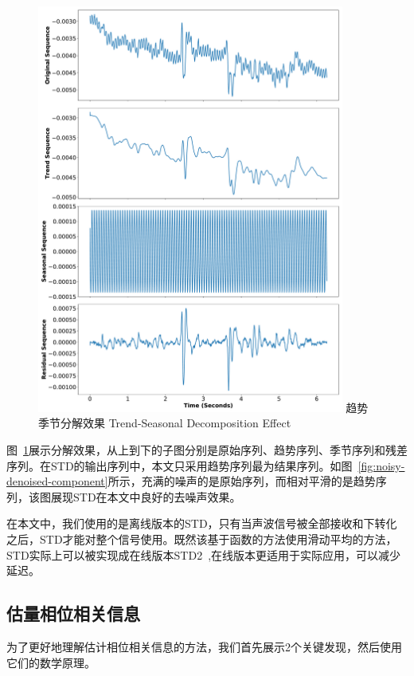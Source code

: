 \begin{figure}[!htp]
  \centering
  \includegraphics[width=0.9\textwidth]{figure/std-effect.pdf}
  \bicaption
    {趋势季节分解效果}
    {Trend-Seasonal Decomposition Effect}
  \label{fig:trend-seasonal-decomposition-effect}
\end{figure}
图~\ref{fig:trend-seasonal-decomposition-effect}展示分解效果，从上到下的子图分别是原始序列、趋势序列、季节序列和残差序列。在STD的输出序列中，本文只采用趋势序列最为结果序列。如图~\ref{fig:noisy-denoised-component}所示，充满的噪声的是原始序列，而相对平滑的是趋势序列，该图展现STD在本文中良好的去噪声效果。

在本文中，我们使用的是离线版本的STD，只有当声波信号被全部接收和下转化之后，STD才能对整个信号使用。既然该基于函数的方法使用滑动平均的方法，STD实际上可以被实现成在线版本STD2~\cite{std2},在线版本更适用于实际应用，可以减少延迟。

\subsection{估量相位相关信息}
为了更好地理解估计相位相关信息的方法，我们首先展示2个关键发现，然后使用它们的数学原理。

